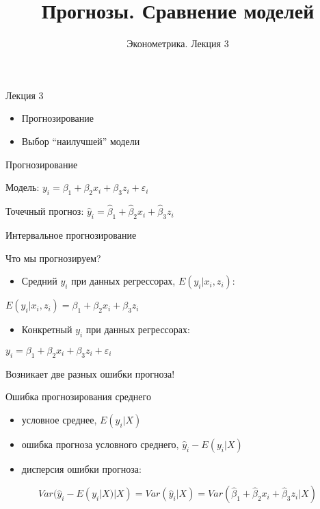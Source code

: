 \documentclass[ignorenonframetext,]{beamer}
\author[Эконометрика. Лекция 3]{Эконометрика. Лекция 3}
\title{Прогнозы. Сравнение моделей}
\date{}
\newcommand{\hy}{\hat{y}}
\begin{document}
\frame{\titlepage}

\begin{frame}{Лекция 3}

\begin{itemize}
\item
  Прогнозирование
\item
  Выбор ``наилучшей'' модели
\end{itemize}

\end{frame}

\begin{frame}{Прогнозирование}

Модель: \(y_i = \beta_1 + \beta_2 x_i + \beta_3 z_i + \varepsilon_i\)

Точечный прогноз:
\(\hat{y}_i = \hat{\beta}_1 +\hat{\beta}_2 x_i + \hat{\beta}_3 z_i\)

\end{frame}

\begin{frame}{Интервальное прогнозирование}

Что мы прогнозируем?

\begin{itemize}
\itemsep1pt\parskip0pt
\item
  Средний \(y_i\) при данных регрессорах, \(E(y_i | x_i, z_i)\):
\end{itemize}

\(E(y_i | x_i, z_i)=\beta_1 + \beta_2 x_i + \beta_3 z_i\)

\begin{itemize}
\itemsep1pt\parskip0pt
\item
  Конкретный \(y_i\) при данных регрессорах:
\end{itemize}

\(y_i= \beta_1 + \beta_2 x_i + \beta_3 z_i + \varepsilon_i\)

Возникает две разных ошибки прогноза!

\end{frame}

\begin{frame}{Ошибка прогнозирования среднего}

\begin{itemize}
\item
  условное среднее, \(E(y_i | X)\)
\item
  ошибка прогноза условного среднего, \(\hat{y}_i - E(y_i | X)\)
\item
  дисперсия ошибки прогноза:
\end{itemize}

\[
Var(\hy_i - E(y_i | X)  | X )=Var(\hat{y}_i | X)  =Var(\hat{\beta}_1 +\hat{\beta}_2 x_i + \hat{\beta}_3 z_i | X)
\]

\end{frame}
\end{document}
